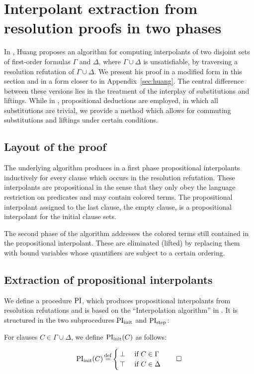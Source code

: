 \chapter{Interpolant extraction from resolution proofs in two phases}
\label{sec:two_phases}
\label{chap:two_phases}

In \cite{Huang95}, Huang proposes an algorithm for computing interpolants of two disjoint sets of first-order formulas $\Gamma$ and $\Delta$, where $\Gamma\cup\Delta$ is unsatisfiable, by traversing a resolution refutation of $\Gamma \cup \Delta$.
We present his proof in a modified form in this section and in a form closer to \cite{Huang95} in Appendix~\ref{sec:huang}.
The central difference between these versions lies in the treatment of the interplay of substitutions and liftings.
While in \cite{Huang95}, propositional deductions are employed, in which all substitutions are trivial,
we provide a method which allows for commuting substitutions and liftings under certain conditions.

\section{Layout of the proof}

The underlying algorithm produces in a first phase propositional interpolants inductively for every clause which occurs in the resolution refutation.
These interpolants are propositional in the sense that they only obey the language restriction on predicates and may contain colored terms.
The propositional interpolant assigned to the last clause, the empty clause, is a propositional interpolant for the initial clause sets.

The second phase of the algorithm addresses the colored terms still contained in the propositional interpolant.
These are eliminated (lifted) by replacing them with bound variables whose quantifiers are subject to a certain ordering.



\section{Extraction of propositional interpolants}

We define a procedure $\operatorname{PI}$, which produces propositional interpolants from resolution refutations and is based on the ``Interpolation algorithm'' in \cite{Huang95}.
It is structured in the two subprocedures $\PIinit$ and $\operatorname{PI}_{\mathrm{step}}$:

\begin{defi}[$\PIinit$]
	For clauses $C \in \Gamma\cup\Delta$, we define $\operatorname{PI}_{\mathrm{init}}(C)$ as follows:

	\[\PIinit(C) \defeq
	\begin{cases}
		\bot & \text{ if $C \in \Gamma$} \\
		\top & \text{ if $C \in \Delta$}  
	\end{cases}
	\qedhere
\]
\end{defi}

